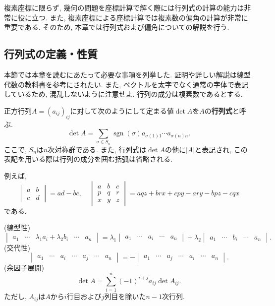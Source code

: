 複素座標に限らず, 幾何の問題を座標計算で解く際には行列式の計算の能力は非常に役に立つ.
また, 複素座標による座標計算では複素数の偏角の計算が非常に重要である.
そのため, 本章では行列式および偏角についての解説を行う.
\subsection{行列式の定義・性質}
本節では本章を読むにあたって必要な事項を列挙した.
証明や詳しい解説は線型代数の教科書を参考にされたい.
また, ベクトルを太字でなく通常の字体で表記しているため, 混乱しないように注意せよ.
行列の成分は複素数であるとする.
\begin{bdef}
正方行列$A=(a_{ij})_{ij}$に対して次のようにして定まる値$\det A$を$A$の\textbf{行列式}と呼ぶ.
\[\det A=\sum_{\sigma\in S_n}\operatorname{sgn}(\sigma)a_{\sigma(1)1}\cdots a_{\sigma(n)n}.\]
ここで, $S_n$は$n$次対称群である.
また, 行列式は$\det A$の他に$\lvert A\rvert$と表記され, この表記を用いる際は行列の成分を囲む括弧は省略される.
\end{bdef}
例えば,
\[\begin{vmatrix}a&b\\c&d\end{vmatrix}=ad-bc,\quad\begin{vmatrix}a&b&c\\p&q&r\\x&y&z\end{vmatrix}=aqz+brx+cpy-ary-bpz-cqx\]
である.
\begin{bprop}
(線型性)
\[\begin{vmatrix}a_1&\cdots&\lambda_1a_i+\lambda_2b_i&\cdots&a_n\end{vmatrix}=\lambda_1\begin{vmatrix}a_1&\cdots&a_i&\cdots&a_n\end{vmatrix}+\lambda_2\begin{vmatrix}a_1&\cdots&b_i&\cdots&a_n\end{vmatrix}.\]
(交代性)
\[\begin{vmatrix}a_1&\cdots&a_i&\cdots&a_j&\cdots&a_n\end{vmatrix}=-\begin{vmatrix}a_1&\cdots&a_j&\cdots&a_i&\cdots&a_n\end{vmatrix}.\]
(余因子展開)
\[\det A=\sum_{i=1}^n(-1)^{i+j}a_{ij}\det A_{ij}.\]
ただし, $A_{ij}$は$A$から$i$行目および$j$列目を除いた$n-1$次行列.
\end{bprop}
